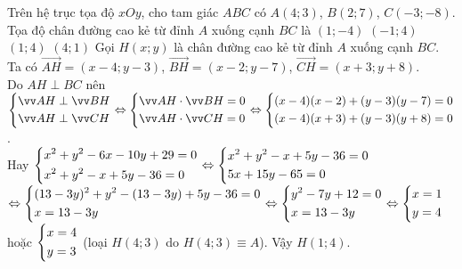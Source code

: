 \begin{ex}%
Trên hệ trục tọa độ $xOy$, cho tam giác $ABC$ có $A\left(4;3\right)$, $B\left(2;7\right)$, $C\left(-3;-8\right)$. Tọa độ chân đường cao kẻ từ đỉnh $A$ xuống cạnh $BC$ là
\choice
{$\left(1;-4\right)$}
{$\left(-1;4\right)$}
{\True $\left(1;4\right)$}
{$\left(4;1\right)$}
\loigiai
{
Gọi $H\left(x;y\right)$ là chân đường cao kẻ từ đỉnh $A$ xuống cạnh $BC$.\\Ta có $\vec{AH}=\left(x-4;y-3\right)$, $\vec{BH}=\left(x-2;y-7\right)$, $\vec{CH}=\left(x+3;y+8\right)$.\\Do $AH\perp BC$ nên $\heva{&\vec{AH}\perp\vec{BH}\\&\vec{AH}\perp\vec{CH}}\Leftrightarrow\heva{&\vec{AH}\cdot\vec{BH}=0\\&\vec{AH}\cdot\vec{CH}=0}\Leftrightarrow\heva{&(x-4)(x-2)+(y-3)(y-7)=0\\&(x-4)(x+3)+(y-3)(y+8)=0}$.\\Hay $\left\{\begin{aligned}&x^2+y^2-6x-10y+29=0\\&x^2+y^2-x+5y-36=0\end{aligned}\right.\Leftrightarrow\left\{\begin{aligned}&x^2+y^2-x+5y-36=0\\&5x+15y-65=0\end{aligned}\right.$\\ $\Leftrightarrow\left\{\begin{aligned}&(13-3y)^2+y^2-(13-3y)+5y-36=0\\&x=13-3y\end{aligned}\right.\Leftrightarrow\left\{\begin{aligned}&y^2-7y+12=0\\&x=13-3y\end{aligned}\right.\Leftrightarrow\left\{\begin{aligned}&x=1\\&y=4\end{aligned}\right.$ hoặc $\left\{\begin{aligned}&x=4\\&y=3\end{aligned}\right.$ (loại $H\left(4;3\right)$ do $H\left(4;3\right)\equiv A$). Vậy $H(1;4)$.
}
\end{ex}


